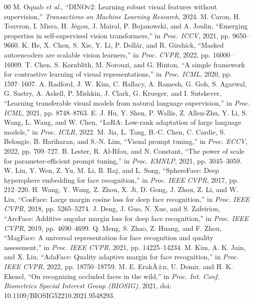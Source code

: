 ﻿\documentclass[10pt,journal,compsoc]{IEEEtran}
\begin{document}

\begin{thebibliography}{00}
 M. Oquab \textit{et al.}, ``DINOv2: Learning robust visual features without supervision,'' \textit{Transactions on Machine Learning Research}, 2024.
 M. Caron, H. Touvron, I. Misra, H. J\'egou, J. Mairal, P. Bojanowski, and A. Joulin, ``Emerging properties in self-supervised vision transformers,'' in \textit{Proc. ICCV}, 2021, pp. 9650--9660.
 K. He, X. Chen, S. Xie, Y. Li, P. Doll\'ar, and R. Girshick, ``Masked autoencoders are scalable vision learners,'' in \textit{Proc. CVPR}, 2022, pp. 16000--16009.
 T. Chen, S. Kornblith, M. Norouzi, and G. Hinton, ``A simple framework for contrastive learning of visual representations,'' in \textit{Proc. ICML}, 2020, pp. 1597--1607.
 A. Radford, J. W. Kim, C. Hallacy, A. Ramesh, G. Goh, S. Agarwal, G. Sastry, A. Askell, P. Mishkin, J. Clark, G. Krueger, and I. Sutskever, ``Learning transferable visual models from natural language supervision,'' in \textit{Proc. ICML}, 2021, pp. 8748--8763.
 E. J. Hu, Y. Shen, P. Wallis, Z. Allen-Zhu, Y. Li, S. Wang, L. Wang, and W. Chen, ``LoRA: Low-rank adaptation of large language models,'' in \textit{Proc. ICLR}, 2022.
 M. Jia, L. Tang, B.-C. Chen, C. Cardie, S. Belongie, B. Hariharan, and S.-N. Lim, ``Visual prompt tuning,'' in \textit{Proc. ECCV}, 2022, pp. 709--727.
 B. Lester, R. Al-Rfou, and N. Constant, ``The power of scale for parameter-efficient prompt tuning,'' in \textit{Proc. EMNLP}, 2021, pp. 3045--3059.
 W. Liu, Y. Wen, Z. Yu, M. Li, B. Raj, and L. Song, ``SphereFace: Deep hypersphere embedding for face recognition,'' in \textit{Proc. IEEE CVPR}, 2017, pp. 212--220.
 H. Wang, Y. Wang, Z. Zhou, X. Ji, D. Gong, J. Zhou, Z. Li, and W. Liu, ``CosFace: Large margin cosine loss for deep face recognition,'' in \textit{Proc. IEEE CVPR}, 2018, pp. 5265--5274.
 J. Deng, J. Guo, N. Xue, and S. Zafeiriou, ``ArcFace: Additive angular margin loss for deep face recognition,'' in \textit{Proc. IEEE CVPR}, 2019, pp. 4690--4699.
 Q. Meng, S. Zhao, Z. Huang, and F. Zhou, ``MagFace: A universal representation for face recognition and quality assessment,'' in \textit{Proc. IEEE CVPR}, 2021, pp. 14225--14234.
 M. Kim, A. K. Jain, and X. Liu, ``AdaFace: Quality adaptive margin for face recognition,'' in \textit{Proc. IEEE CVPR}, 2022, pp. 18750--18759.
 M. E. ErakÄ±n, U. Demir, and H. K. Ekenel, ``On recognizing occluded faces in the wild,'' in \textit{Proc. Int. Conf. Biometrics Special Interest Group (BIOSIG)}, 2021, doi: 10.1109/BIOSIG52210.2021.9548293.

\end{thebibliography}
\end{document}
